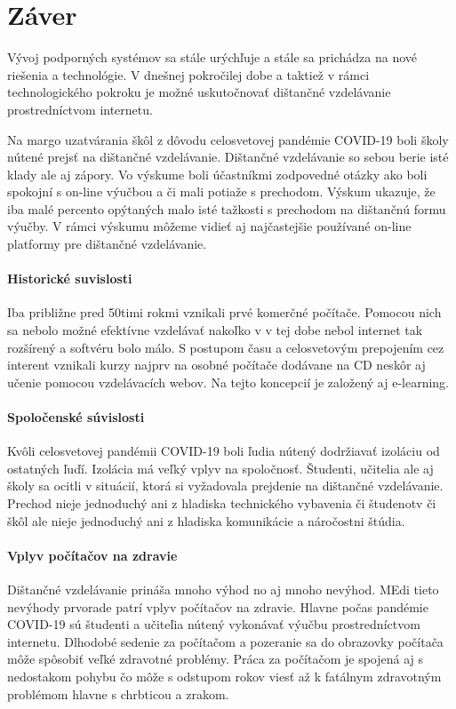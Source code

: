 \documentclass[10pt,oneside,slovak,a4paper]{article}
\begin{document}
\section*{Záver}
Vývoj podporných systémov sa stále urýchľuje a stále sa prichádza na nové riešenia a technológie. V dnešnej pokročilej dobe a taktiež v rámci technologického pokroku je možné uskutočnovať dištančné vzdelávanie prostredníctvom internetu.

Na margo uzatvárania škôl z dôvodu celosvetovej pandémie COVID-19 boli školy nútené prejsť na dištančné vzdelávanie. Dištančné vzdelávanie so sebou berie isté klady ale aj zápory. Vo výskume boli účastníkmi zodpovedné otázky ako boli spokojní s on-line výučbou a či mali potiaže s prechodom.
Výskum ukazuje, že iba malé percento opýtaných malo isté tažkosti s prechodom na dištančnú formu výučby. V rámci výskumu môžeme vidieť aj najčastejšie používané on-line platformy pre dištančné vzdelávanie.
\paragraph{Historické suvislosti}
Iba približne pred 50timi rokmi vznikali prvé komerčné počítače. Pomocou nich sa nebolo možné efektívne vzdelávať nakoľko v v tej dobe nebol internet tak rozšírený a softvéru bolo málo. S postupom času a celosvetovým prepojením cez interent vznikali kurzy najprv na osobné počítače dodávane na CD neskôr aj učenie pomocou vzdelávacích webov. Na tejto koncepcií je založený aj e-learning.
\paragraph{Spoločenské súvislosti}
Kvôli celosvetovej pandémii COVID-19 boli ľudia nútený dodržiavať izoláciu od ostatných ľuďí. Izolácia má veľký vplyv na spoločnosť. Študenti, učitelia ale aj školy sa ocitli v situácií, ktorá si vyžadovala prejdenie na dištančné vzdelávanie. Prechod nieje jednoduchý ani z hladiska technického vybavenia či študenotv či škôl ale nieje jednoduchý ani z hladiska komunikácie a náročostni štúdia. 
\paragraph{Vplyv počítačov na zdravie}
Dištančné vzdelávanie prináša mnoho výhod no aj mnoho nevýhod. MEdi tieto nevýhody prvorade patrí vplyv počítačov na zdravie. Hlavne počas pandémie COVID-19 sú študenti a učiteľia nútený vykonávať výučbu prostredníctvom internetu. Dlhodobé sedenie za počítačom a pozeranie sa do obrazovky počítača môže spôsobiť veľké zdravotné problémy. Práca za počítačom je spojená aj s nedostakom pohybu čo môže s odstupom rokov viesť až k fatálnym zdravotným problémom hlavne s chrbticou a zrakom.




\end{document}
